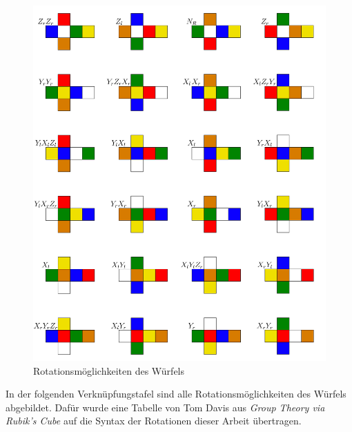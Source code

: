 \documentclass[12pt,a4paper, usenames, dvipsnames]{article}
\theoremstyle{mystyle}
\theoremstyle{definition}
\begin{document}
\begin{figure}[H]
\centering
\includegraphics[scale=0.065]{AlleRotationen.png}
\caption{Rotationsmöglichkeiten des Würfels}
\label{AbbildungWürfelRotationAlleSeiten}
\end{figure}





In der folgenden Verknüpfungstafel sind alle Rotationsmöglichkeiten des Würfels abgebildet. Dafür wurde eine Tabelle von Tom Davis aus \textit{Group Theory via Rubik's Cube} \cite{TD} auf die Syntax der Rotationen dieser Arbeit übertragen. 

\vspace*{1em}
\end{document}
